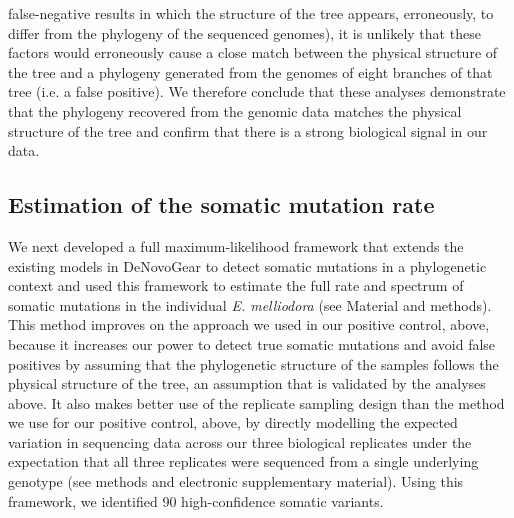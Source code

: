 false-negative results in which the structure of the tree appears, erroneously, to differ from the phylogeny of the sequenced genomes), it is unlikely that these factors would erroneously cause a close match between the physical structure of the tree and a phylogeny generated from the genomes of eight branches of that tree (i.e. a false positive). We therefore conclude that these analyses demonstrate that the phylogeny recovered from the genomic data matches the physical structure of the tree and confirm that there is a strong biological signal in our data.

\subsection{Estimation of the somatic mutation rate}

We next developed a full maximum-likelihood framework that extends the existing models in DeNovoGear \parencite{ramu_denovogear_2013} to detect somatic mutations in a phylogenetic context and used this framework to estimate the full rate and spectrum of somatic mutations in the individual \textit{E. melliodora} (see Material and methods). This method improves on the approach we used in our positive control, above, because it increases our power to detect true somatic mutations and avoid false positives by assuming that the phylogenetic structure of the samples follows the physical structure of the tree, an assumption that is validated by the analyses above. It also makes better use of the replicate sampling design than the method we use for our positive control, above, by directly modelling the expected variation in sequencing data across our three biological replicates under the expectation that all three replicates were sequenced from a single underlying genotype (see methods and electronic supplementary material). Using this framework, we identified 90 high-confidence somatic variants.

